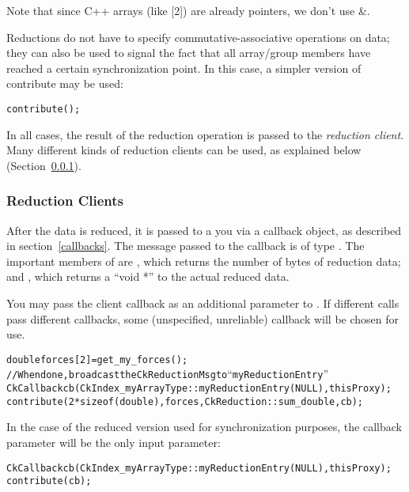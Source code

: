 Note that since C++ arrays (like [2]) are already pointers, we 
don't use \&.

Reductions do not have to specify commutative-associative operations on data;
they can also be used to signal the fact that all array/group members
have reached a certain synchronization point. In this case, a simpler version
of contribute may be used:


\begin{alltt}
    contribute();
\end{alltt}

In all cases, the result of the reduction operation is passed to the {\em reduction
client}.  Many different kinds of reduction clients can be used, as
explained below (Section~\ref{reductionClients}).



\subsubsection{Reduction Clients}

\label{reductionClients}

After the data is reduced, it is passed to a you via a callback object,
as described in section~\ref{callbacks}.  The message passed to
the callback is of type .
The important members of  are
, which returns the number of bytes of reduction data; and
, which returns a ``void *'' to the actual reduced data.

You may pass the client callback as an additional parameter to .
If different  calls pass different callbacks, some (unspecified,
unreliable) callback will be chosen for use.
\begin{alltt}
    double forces[2]=get_my_forces();
    // When done, broadcast the CkReductionMsg to ``myReductionEntry''
    CkCallback cb(CkIndex_myArrayType::myReductionEntry(NULL), thisProxy);
    contribute(2*sizeof(double), forces,CkReduction::sum_double, cb);
\end{alltt}

In the case of the reduced version used for synchronization purposes, the
callback parameter will be the only input parameter:
\begin{alltt}
    CkCallback cb(CkIndex_myArrayType::myReductionEntry(NULL), thisProxy);
    contribute(cb);
\end{alltt}

